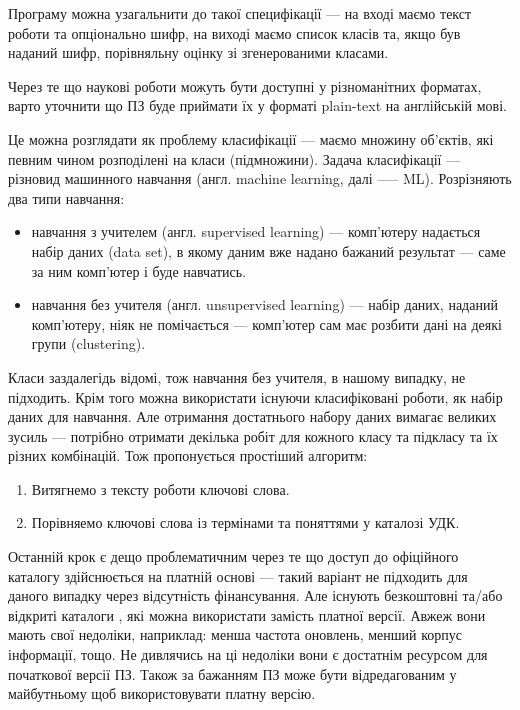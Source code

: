 \documentclass[14pt]{extarticle}
\begin{document}
  Програму можна узагальнити до такої специфікації ---
  на вході маємо текст роботи та опціонально шифр,
  на виході маємо список класів та, якщо був наданий шифр,
  порівняльну оцінку зі згенерованими класами.

  Через те що наукові роботи можуть бути доступні у різноманітних форматах,
  варто уточнити що ПЗ буде приймати їх
  у форматі plain-text на англійській мові.

  Це можна розглядати як проблему класифікації
  \cite{multiclass_classification_wiki, statistical_classification_wiki}
  --- маємо множину об'єктів,
  які певним чином розподілені на класи (підмножини).
  Задача класифікації ---
  різновид машинного навчання
  \cite{machine_learning_wiki} (англ. machine learning, далі —-- ML).
  Розрізняють два типи навчання:
  \begin{itemize}[labelindent=\dimexpr{}\relax, leftmargin=*]
    \item навчання з учителем (англ. supervised learning) ---
    комп'ютеру надається набір даних (data set),
    в якому даним вже надано бажаний результат ---
    саме за ним комп'ютер і буде навчатись.

    \item навчання без учителя (англ. unsupervised learning) ---
    набір даних, наданий комп'ютеру, ніяк не помічається ---
    комп'ютер сам має розбити дані на деякі групи (clustering).
  \end{itemize}

  Класи заздалегідь відомі, тож навчання без учителя, в нашому випадку,
  не підходить. Крім того можна використати існуючи класифіковані роботи,
  як набір даних для навчання.
  Але отримання достатнього набору даних вимагає великих зусиль ---
  потрібно отримати декілька робіт для кожного класу та підкласу
  та їх різних комбінацій. Тож пропонується простіший алгоритм:
  \begin{enumerate}[labelindent=\dimexpr\parindent*2\relax, leftmargin=*]
    \item Витягнемо з тексту роботи ключові слова. \cite{keyword_extraction_wiki}
    \item Порівняемо ключові слова із термінами та поняттями у каталозі УДК.
  \end{enumerate}

  Останній крок є дещо проблематичним
  через те що доступ до офіційного каталогу здійснюється на платній основі ---
  такий варіант не підходить для даного випадку через відсутність фінансування.
  Але існують безкоштовні та/або відкриті каталоги
  \cite{udc_summary, udc_summary_linked},
  які можна використати замість платної версії.
  Авжеж вони мають свої недоліки, наприклад: менша частота оновлень,
  менший корпус інформації, тощо.
  Не дивлячись на ці недоліки
  вони є достатнім ресурсом для початкової версії ПЗ.
  Також за бажанням ПЗ може бути відредагованим
  у майбутньому щоб використовувати платну версію.
\end{document}
